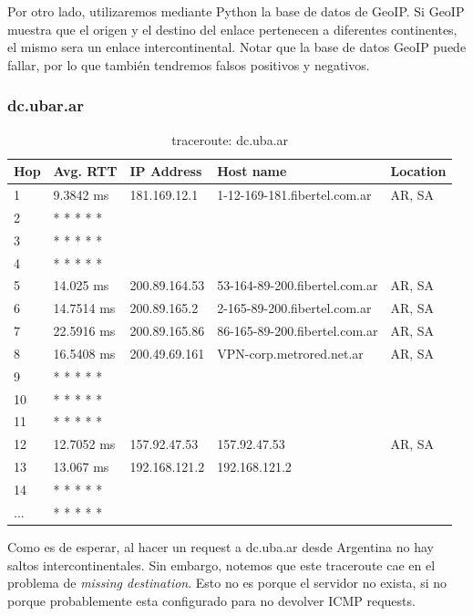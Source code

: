 \vspace{5px}

Por otro lado, utilizaremos mediante Python la base de datos de GeoIP. Si GeoIP muestra que el origen y el destino del enlace pertenecen a diferentes continentes, el mismo sera un enlace intercontinental. Notar que la base de datos GeoIP puede fallar, por lo que también tendremos falsos positivos y negativos.

\subsubsection{dc.ubar.ar}

\begin{table}[H]
\centering
\caption{traceroute: dc.uba.ar}
\begin{tabular}{@{}lllll@{}}
\toprule
Hop & Avg. RTT & IP Address & Host name & Location\\ \midrule
1 & 9.3842 ms & 181.169.12.1 & 1-12-169-181.fibertel.com.ar & AR, SA\\
2 &  * * * * * &  &  &  \\
3 &  * * * * * &  &  &  \\
4 &  * * * * * &  &  &  \\
5 & 14.025 ms & 200.89.164.53 & 53-164-89-200.fibertel.com.ar & AR, SA\\
6 & 14.7514 ms & 200.89.165.2  & 2-165-89-200.fibertel.com.ar & AR, SA\\
7 & 22.5916 ms & 200.89.165.86 & 86-165-89-200.fibertel.com.ar & AR, SA\\
8 & 16.5408 ms & 200.49.69.161 & VPN-corp.metrored.net.ar & AR, SA\\
9 &  * * * * * &  &  &  \\
10 &  * * * * * &  &  &  \\
11 &  * * * * * &  &  &  \\
12 & 12.7052 ms & 157.92.47.53 & 157.92.47.53 & AR, SA\\
13 & 13.067 ms & 192.168.121.2 & 192.168.121.2 &  \\
14 &  * * * * * &  &  &  \\
... &  * * * * * &  &  &  \\

 \bottomrule
\end{tabular}
\label{dc}
\end{table}

Como es de esperar, al hacer un request a dc.uba.ar desde Argentina no hay saltos intercontinentales. Sin embargo, notemos que este traceroute cae en el problema de \textit{missing destination}. Esto no es porque el servidor no exista, si no porque probablemente esta configurado para no devolver ICMP requests.


